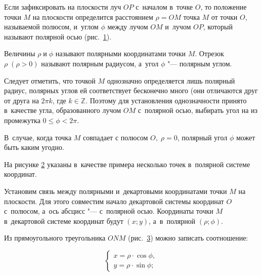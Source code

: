Если зафиксировать на плоскости луч $OP$ с~началом в~точке $O$,
то положение точки $M$ на плоскости определится расстоянием $\rho = OM$
точка $M$ от точки $O$, называемой полюсом, и~углом $\phi$ между
лучом $OM$ и~лучом $OP$, который называют полярной осью (рис.\ \ref{fig_1_14_44}).

\begin{figure}\label{fig_1_14_44}
\end{figure}

Величины $\rho \; \text{и} \; \phi$ называют полярными координатами точки $M$.
Отрезок $\rho \; (\rho > 0)$ называют полярным радиусом,
а~угол $\phi$ "--- полярным углом.

Следует отметить, что точкой $M$ однозначно определяется лишь полярный радиус,
полярных углов ей соответствует бесконечно много (они отличаются друг от друга
на $2\pi k$, где $k \in \mathbb{Z}$.
Поэтому для установления однозначности принято в~качестве угла,
образованного лучом $OM$ с~полярной осью, выбирать угол на из промежутка
$0 \leqslant \phi < 2\pi$.

В~случае, когда точка $M$ совпадает с полюсом $O, \; \rho =  0$,
полярный угол $\phi$ может быть каким угодно.

На рисунке \ref{fig_1_14_45} указаны в~качестве примера несколько точек
в~полярной системе координат.

\begin{figure}\label{fig_1_14_45}
\end{figure}

Установим связь между полярными и~декартовыми координатами точки $M$
на плоскости. Для этого совместим начало декартовой системы координат $O$
с~полюсом, а~ось абсцисс "--- с~полярной осью.
Координаты точки $M$ в~декартовой системе координат будут $(x; y)$,
а~в~полярной $(\rho; \phi)$.

Из прямоугольного треугольника $O N M$ (рис.\ \ref{fig_1_14_46}) можно записать соотношение:

\begin{figure}\label{fig_1_14_46}
\end{figure}

\begin{equation}\label{eq_1_14_1}
\begin{cases}
x = \rho \cdot \cos \phi, \\
y = \rho \cdot \sin \phi;
\end{cases}
\end{equation}

